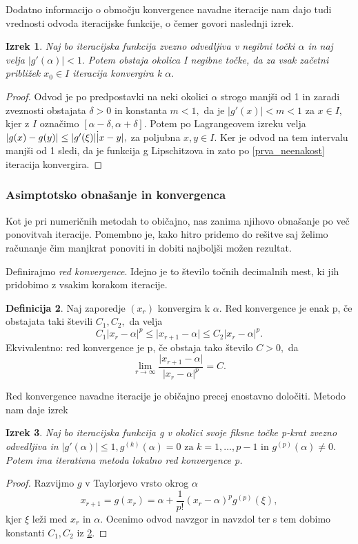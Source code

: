 \documentclass[12pt,a4paper]{amsart}
\theoremstyle{definition} %
\newtheorem{definicija}{Definicija}[section]
\theoremstyle{plain} %
\newtheorem{izrek}[definicija]{Izrek}
\begin{document}
Dodatno informacijo o območju konvergence navadne iteracije nam dajo tudi vrednosti odvoda iteracijske funkcije, o čemer govori naslednji izrek.
\begin{izrek}
    Naj bo iteracijska funkcija zvezno odvedljiva v negibni točki $\alpha$ in naj velja $\lvert g'(\alpha) \rvert < 1.$ Potem obstaja okolica I negibne točke,
    da za vsak začetni približek $x_{0} \in I$ iteracija konvergira k $\alpha.$
\end{izrek}
\begin{proof}
    Odvod je po predpostavki na neki okolici $\alpha$ strogo manjši od 1 in zaradi zveznosti obstajata $\delta > 0$ in konstanta $m < 1,$ da je $\lvert g'(x) \rvert < m < 1$ za $x \in I,$
    kjer z $I$ označimo $[\alpha - \delta,\alpha + \delta ].$ Potem po Lagrangeovem izreku velja $\lvert g(x) - g(y) \rvert \leq \lvert g'(\xi) \rvert \dot \lvert x - y \rvert,$
    za poljubna $x,y \in I.$ Ker je odvod na tem intervalu manjši od 1 sledi, da je funkcija g Lipschitzova in zato po \eqref{prva_neenakost} iteracija konvergira.
\end{proof}

\subsubsection{Asimptotsko obnašanje in konvergenca}
Kot je pri numeričnih metodah to običajno, nas zanima njihovo obnašanje po več ponovitvah iteracije. Pomembno je, kako hitro pridemo do rešitve saj želimo računanje čim manjkrat
ponoviti in dobiti najboljši možen rezultat.

Definirajmo \textit{red konvergence}. Idejno je to število točnih decimalnih mest, ki jih pridobimo z vsakim korakom iteracije. 
\begin{definicija}\label{red_konv}
    Naj zaporedje $(x_{r})$ konvergira k $\alpha.$ Red konvergence je enak p, če obstajata taki števili $C_{1}, C_{2},$ da velja
    \[
        C_{1}\lvert x_{r} - \alpha \rvert ^{p} \leq \lvert x_{r+1} - \alpha \rvert \leq C_{2} \lvert x_{r} - \alpha \rvert^{p}.
    \]
    Ekvivalentno: red konvergence je p, če obstaja tako število $C > 0,$ da
    \[
        \lim_{r\to\infty} \frac{\lvert x_{r+1} - \alpha\rvert}{\lvert x_{r} - \alpha\rvert^{p}} = C.
    \]
\end{definicija}

Red konvergence navadne iteracije je običajno precej enostavno določiti. Metodo nam daje izrek
\begin{izrek}
    Naj bo iteracijska funkcija g v okolici svoje fiksne točke p-krat zvezno odvedljiva in $\lvert g'(\alpha) \rvert \leq 1, g^{(k)}(\alpha) = 0\text{ za }k = 1,\ldots,p-1 \text{ in }
    g^{(p)}(\alpha) \neq 0.$ Potem ima iterativna metoda lokalno red konvergence p.
\end{izrek}
\begin{proof}
    Razvijmo $g$ v Taylorjevo vrsto okrog $\alpha$
    \[
        x_{r+1} = g(x_{r}) = \alpha + \frac{1}{p!}(x_{r} - \alpha)^{p}g^{(p)}(\xi),
    \]
    kjer $\xi$ leži med $x_{r}$ in $\alpha.$ Ocenimo odvod navzgor in navzdol ter s tem dobimo konstanti $C_{1},C_{2}$ iz \ref{red_konv}.
\end{proof}
\end{document}
